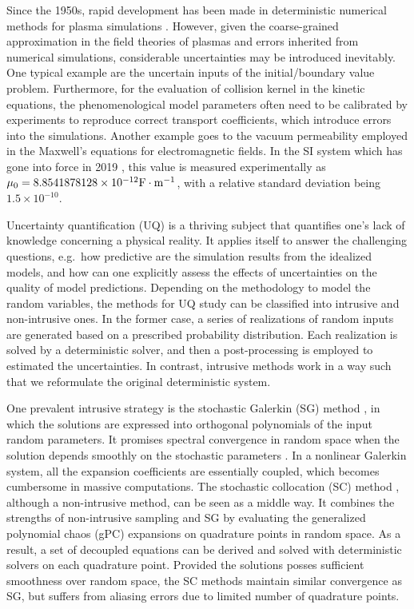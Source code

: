 \documentclass[preprint,3p,12pt,sort&compress]{elsarticle}
\begin{document}
Since the 1950s, rapid development has been made in deterministic numerical methods for plasma simulations \cite{vahedi1995monte,filbet2001conservative,crouseilles2009forward,qiu2010conservative,brio1988upwind,powell1999solution,degond2010asymptotic,degond2017asymptotic}.
However, given the coarse-grained approximation in the field theories of plasmas and errors inherited from numerical simulations, considerable uncertainties may be introduced inevitably. 
One typical example are the uncertain inputs of the initial/boundary value problem.
Furthermore, for the evaluation of collision kernel in the kinetic equations, the phenomenological model parameters often need to be calibrated by experiments to reproduce correct transport coefficients, which introduce errors into the simulations.
Another example goes to the vacuum permeability employed in the Maxwell's equations for electromagnetic fields.
In the SI system which has gone into force in 2019 \cite{nistrefer2019}, this value is measured experimentally as $\mu_0=8.854 187 8128 \times 10^{-12} \rm F\cdot m^{-1} $, with a relative standard deviation being $1.5 \times 10^{-10}$.

Uncertainty quantification (UQ) is a thriving subject that quantifies one's lack of knowledge concerning a physical reality.
It applies itself to answer the challenging questions, e.g.\ how predictive are the simulation results from the idealized models, and how can one explicitly assess the effects of uncertainties on the quality of model predictions.
Depending on the methodology to model the random variables, the methods for UQ study can be classified into intrusive and non-intrusive ones. 
In the former case, a series of realizations of random inputs are generated based on a prescribed probability distribution.
Each realization is solved by a deterministic solver, and then a post-processing is employed to estimated the uncertainties.
In contrast, intrusive methods work in a way such that we reformulate the original deterministic system. 

One prevalent intrusive strategy is the stochastic Galerkin (SG) method \cite{xiu2010numerical}, in which the solutions are expressed into orthogonal polynomials of the input random parameters. 
It promises spectral convergence in random space when the solution depends smoothly on the stochastic parameters \cite{canuto1982approximation}. 
In a nonlinear Galerkin system, all the expansion coefficients are essentially coupled, which becomes cumbersome in massive computations.
The stochastic collocation (SC) method \cite{xiu2005high}, although a non-intrusive method, can be seen as a middle way.
It combines the strengths of non-intrusive sampling and SG by evaluating the generalized polynomial chaos (gPC) expansions on quadrature points in random space. 
As a result, a set of decoupled equations can be derived and solved with deterministic solvers on each quadrature point. 
Provided the solutions posses sufficient smoothness over random space, the SC methods maintain similar convergence as SG, but suffers from aliasing errors due to limited number of quadrature points.
\end{document}
